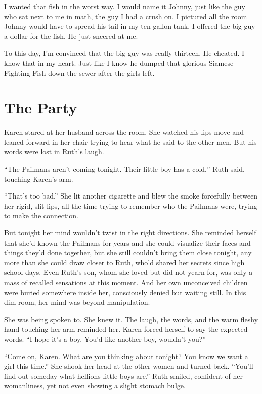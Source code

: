 \documentclass[twoside,10pt]{book}
\begin{document}
I wanted that fish in the worst way. I would name it Johnny, just like
the guy who sat next to me in math, the guy I had a crush on. I pictured
all the room Johnny would have to spread his tail in my ten-gallon tank.
I offered the big guy a dollar for the fish. He just sneered at me.

\clearpage
To this day, I'm convinced that the big guy was really thirteen. He
cheated. I know that in my heart. Just like I know he dumped that
glorious Siamese Fighting Fish down the sewer after the girls left.



\cleardoublepage
\chapter{The Party}

Karen stared at her husband across the room. She watched his lips move
and leaned forward in her chair trying to hear what he said to the other
men. But his words were lost in Ruth's laugh.

``The Pailmans aren't coming tonight. Their little boy has a cold,''
Ruth said, touching Karen's arm.

``That's too bad.'' She lit another cigarette and blew the smoke
forcefully between her rigid, slit lips, all the time trying to remember
who the Pailmans were, trying to make the connection.

But tonight her mind wouldn't twist in the right directions. She
reminded herself that she'd known the Pailmans for years and she could
visualize their faces and things they'd done together, but she still
couldn't bring them close tonight, any more than she could draw closer
to Ruth, who'd shared her secrets since high school days. Even Ruth's
son, whom she loved but did not yearn for, was only a mass of recalled
sensations at this moment. And her own unconceived children were buried
some­where inside her, consciously denied but waiting still. In this dim
room, her mind was beyond manipulation.

She was being spoken to. She knew it. The laugh, the words, and the warm
fleshy hand touch­ing her arm reminded her. Karen forced herself to say
the expected words. ``I hope it's a boy. You'd like another boy,
wouldn't you?''

``Come on, Karen. What are you thinking about tonight? You know we want
a girl this time.'' She shook her head at the other women and turned
back. ``You'll find out someday what hellions little boys are.'' Ruth
smiled, confident of her womanliness, yet not even showing a slight
stomach bulge.
\end{document}
